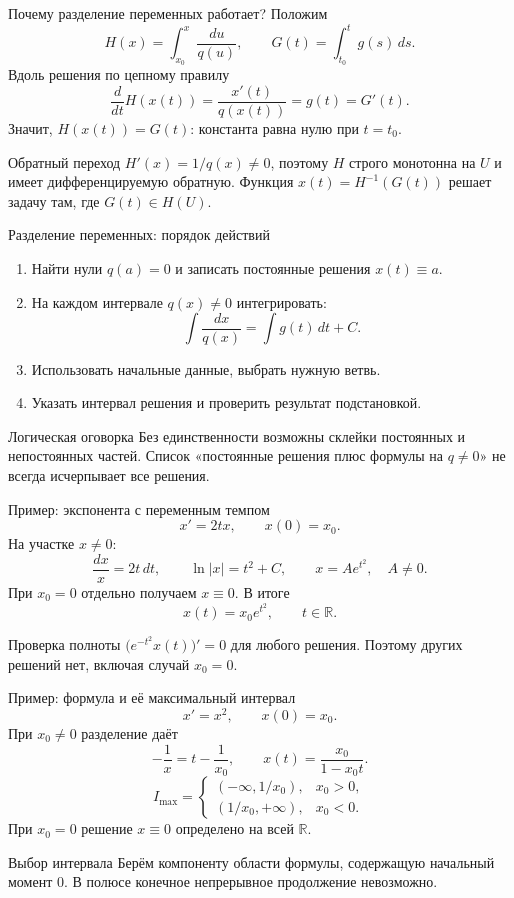 \documentclass[aspectratio=169,11pt]{beamer}
\newcommand{\R}{\mathbb R}
\begin{document}
\begin{frame}{Почему разделение переменных работает?}
Положим
\[
H(x)=\int_{x_0}^x\frac{du}{q(u)},\qquad
G(t)=\int_{t_0}^t g(s)\,ds.
\]
Вдоль решения по цепному правилу
\[
\frac{d}{dt}H(x(t))=\frac{x'(t)}{q(x(t))}=g(t)=G'(t).
\]
Значит, $H(x(t))=G(t)$: константа равна нулю при $t=t_0$.
\begin{block}{Обратный переход}
$H'(x)=1/q(x)\ne0$, поэтому $H$ строго монотонна на $U$
и имеет дифференцируемую обратную.
Функция $x(t)=H^{-1}(G(t))$ решает задачу там, где $G(t)\in H(U)$.
\end{block}
\end{frame}

\begin{frame}{Разделение переменных: порядок действий}
\begin{enumerate}
\item Найти нули $q(a)=0$ и записать постоянные решения $x(t)\equiv a$.
\item На каждом интервале $q(x)\ne0$ интегрировать:
\[
\int\frac{dx}{q(x)}=\int g(t)\,dt+C.
\]
\item Использовать начальные данные, выбрать нужную ветвь.
\item Указать интервал решения и проверить результат подстановкой.
\end{enumerate}
\begin{alertblock}{Логическая оговорка}
Без единственности возможны склейки постоянных и непостоянных частей.
Список «постоянные решения плюс формулы на $q\ne0$»
не всегда исчерпывает все решения.
\end{alertblock}
\end{frame}

\begin{frame}{Пример: экспонента с переменным темпом}
\[
x'=2tx,\qquad x(0)=x_0.
\]
На участке $x\ne0$:
\[
\frac{dx}{x}=2t\,dt,\qquad \ln|x|=t^2+C,
\qquad x=Ae^{t^2},\quad A\ne0.
\]
При $x_0=0$ отдельно получаем $x\equiv0$.
В итоге
\[
\boxed{x(t)=x_0e^{t^2}},\qquad t\in\R.
\]
\begin{block}{Проверка полноты}
$\bigl(e^{-t^2}x(t)\bigr)'=0$ для любого решения.
Поэтому других решений нет, включая случай $x_0=0$.
\end{block}
\end{frame}

\begin{frame}{Пример: формула и её максимальный интервал}
\[
x'=x^2,\qquad x(0)=x_0.
\]
При $x_0\ne0$ разделение даёт
\[
-\frac1x=t-\frac1{x_0},\qquad
\boxed{x(t)=\frac{x_0}{1-x_0t}}.
\]
\[
I_{\max}=
\begin{cases}
(-\infty,1/x_0),&x_0>0,\\
(1/x_0,+\infty),&x_0<0.
\end{cases}
\]
При $x_0=0$ решение $x\equiv0$ определено на всей $\R$.
\begin{alertblock}{Выбор интервала}
Берём компоненту области формулы, содержащую начальный момент $0$.
В полюсе конечное непрерывное продолжение невозможно.
\end{alertblock}
\end{frame}
\end{document}
